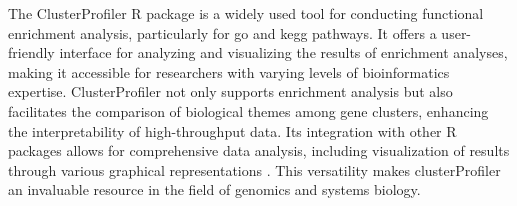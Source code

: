 The ClusterProfiler R package is a widely used tool for conducting functional
enrichment analysis, particularly for \gls{go} and \gls{kegg}
pathways\supercite{wu_clusterprofiler_2021,yu_clusterprofiler_2012}.
It offers a user-friendly interface for analyzing and visualizing the results
of enrichment analyses, making it accessible for researchers with varying
levels of bioinformatics expertise\supercite{dai_identification_2020}.
ClusterProfiler not only supports enrichment analysis but also facilitates the
comparison of biological themes among gene clusters, enhancing the
interpretability of high-throughput
data\supercite{yu_clusterprofiler_2012,chen_identification_2021}.
Its integration with other R packages allows for comprehensive data analysis,
including visualization of results through various graphical representations
\supercite{wu_clusterprofiler_2021,xie_identification_2022}.
This versatility makes clusterProfiler an invaluable resource in the field of
genomics and systems biology.
